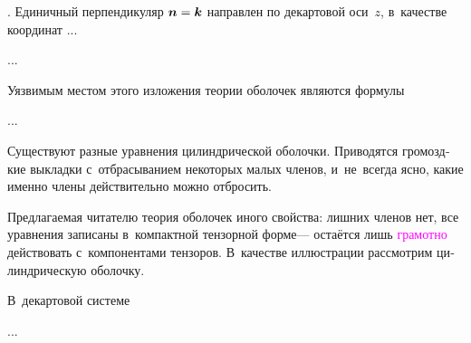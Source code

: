 
\begin{otherlanguage}{russian}

   .
Единичный перпендикуляр ${\bm{n} = \bm{k}}$ направлен по декартовой оси~$z$, в~качестве координат ...

...



\end{otherlanguage}



\begin{otherlanguage}{russian}

Уязвимым местом этого изложения теории оболочек являются формулы

...



\end{otherlanguage}



\begin{otherlanguage}{russian}

Существуют разные уравнения цилиндрической оболочки.
Приводятся громоздкие выкладки с~отбрасыванием некоторых малых членов, и~не~всегда ясно, какие именно члены действительно можно отбросить.

Предлагаемая читателю теория оболочек иного свойства: лишних членов нет, все уравнения записаны в~компактной тензорной форме\:--- остаётся лишь \textcolor{magenta}{грамотно} действовать с~компонентами тензоров.
В~качестве иллюстрации рассмотрим цилиндрическую оболочку.

В~декартовой системе

...



\end{otherlanguage}

